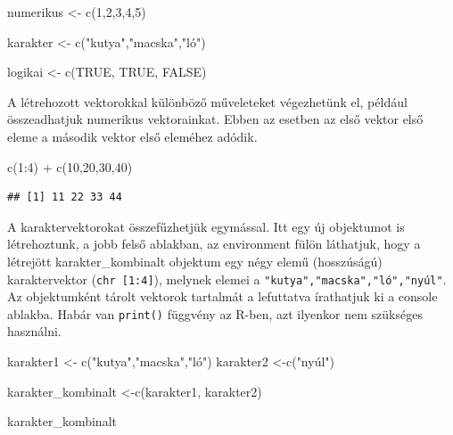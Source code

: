 \documentclass[
]{book}
\newenvironment{Shaded}{\begin{snugshade}}{\end{snugshade}}
\newcommand{\ConstantTok}[1]{\textcolor[rgb]{0.00,0.00,0.00}{#1}}
\newcommand{\DecValTok}[1]{\textcolor[rgb]{0.00,0.00,0.81}{#1}}
\newcommand{\FunctionTok}[1]{\textcolor[rgb]{0.00,0.00,0.00}{#1}}
\newcommand{\NormalTok}[1]{#1}
\newcommand{\OtherTok}[1]{\textcolor[rgb]{0.56,0.35,0.01}{#1}}
\newcommand{\SpecialCharTok}[1]{\textcolor[rgb]{0.00,0.00,0.00}{#1}}
\newcommand{\StringTok}[1]{\textcolor[rgb]{0.31,0.60,0.02}{#1}}
\begin{document}
\begin{Shaded}
\begin{Highlighting}[]
\NormalTok{numerikus }\OtherTok{\textless{}{-}} \FunctionTok{c}\NormalTok{(}\DecValTok{1}\NormalTok{,}\DecValTok{2}\NormalTok{,}\DecValTok{3}\NormalTok{,}\DecValTok{4}\NormalTok{,}\DecValTok{5}\NormalTok{)}

\NormalTok{karakter }\OtherTok{\textless{}{-}} \FunctionTok{c}\NormalTok{(}\StringTok{"kutya"}\NormalTok{,}\StringTok{"macska"}\NormalTok{,}\StringTok{"ló"}\NormalTok{)}

\NormalTok{logikai }\OtherTok{\textless{}{-}} \FunctionTok{c}\NormalTok{(}\ConstantTok{TRUE}\NormalTok{, }\ConstantTok{TRUE}\NormalTok{, }\ConstantTok{FALSE}\NormalTok{)}
\end{Highlighting}
\end{Shaded}

A létrehozott vektorokkal különböző műveleteket végezhetünk el, például
összeadhatjuk numerikus vektorainkat. Ebben az esetben az első vektor
első eleme a második vektor első eleméhez adódik.

\begin{Shaded}
\begin{Highlighting}[]
\FunctionTok{c}\NormalTok{(}\DecValTok{1}\SpecialCharTok{:}\DecValTok{4}\NormalTok{) }\SpecialCharTok{+} \FunctionTok{c}\NormalTok{(}\DecValTok{10}\NormalTok{,}\DecValTok{20}\NormalTok{,}\DecValTok{30}\NormalTok{,}\DecValTok{40}\NormalTok{)}
\end{Highlighting}
\end{Shaded}

\begin{verbatim}
## [1] 11 22 33 44
\end{verbatim}

A karaktervektorokat összefűzhetjük egymással. Itt egy új objektumot is
létrehoztunk, a jobb felső ablakban, az environment fülön láthatjuk,
hogy a létrejött karakter\_kombinalt objektum egy négy elemű
(hosszúságú) karaktervektor (\texttt{chr\ {[}1:4{]}}), melynek elemei a
\texttt{"kutya","macska","ló","nyúl"}. Az objektumként tárolt vektorok
tartalmát a lefuttatva írathatjuk ki a console ablakba. Habár van
\texttt{print()} függvény az R-ben, azt ilyenkor nem szükséges
használni.

\begin{Shaded}
\begin{Highlighting}[]
\NormalTok{karakter1 }\OtherTok{\textless{}{-}} \FunctionTok{c}\NormalTok{(}\StringTok{"kutya"}\NormalTok{,}\StringTok{"macska"}\NormalTok{,}\StringTok{"ló"}\NormalTok{)}
\NormalTok{karakter2 }\OtherTok{\textless{}{-}}\FunctionTok{c}\NormalTok{(}\StringTok{"nyúl"}\NormalTok{)}

\NormalTok{karakter\_kombinalt }\OtherTok{\textless{}{-}}\FunctionTok{c}\NormalTok{(karakter1, karakter2)}

\NormalTok{karakter\_kombinalt}
\end{Highlighting}
\end{Shaded}
\end{document}
